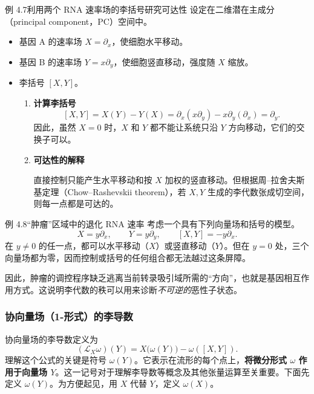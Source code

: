 \begin{statement}{例 4.7}{利用两个 RNA 速率场的李括号研究可达性}
设定在二维潜在主成分（principal component，PC）空间中。
\begin{itemize}
  \item 基因 A 的速率场 $X=\partial_x$，使细胞水平移动。
  \item 基因 B 的速率场 $Y=x\partial_y$，使细胞竖直移动，强度随 $X$ 缩放。
  \item 李括号 $[X,Y]$。
  \begin{enumerate}[label=\arabic*.]
    \item \textbf{计算李括号}
    \[
      [X,Y]=X(Y)-Y(X)=\partial_x(x\partial_y)-x\partial_y(\partial_x)
          =\partial_y.
    \]
    因此，虽然 $X=0$ 时，$X$ 和 $Y$ 都不能让系统只沿 $Y$ 方向移动，它们的交换子可以。
    \item \textbf{可达性的解释}

    直接控制只能产生水平移动和按 $X$ 加权的竖直移动。但根据周–拉舍夫斯基定理（Chow–Rashevskii theorem），若 $X,Y$ 生成的李代数张成切空间，则每一点都是可达的。
  \end{enumerate}
\end{itemize}
\end{statement}

\begin{statement}{例 4.8}{“肿瘤”区域中的退化 RNA 速率}
考虑一个具有下列向量场和括号的模型。
\[
  X=y\partial_x,\qquad Y=y\partial_y,\qquad [X,Y]=-y\partial_x.
\]
在 $y\ne0$ 的任一点，都可以水平移动（$X$）或竖直移动（$Y$）。但在 $y=0$ 处，三个向量场都为零，因而控制或括号的任何组合都无法越过这条屏障。

因此，肿瘤的调控程序缺乏逃离当前转录吸引域所需的“方向”，也就是基因相互作用方式。这说明李代数的秩可以用来诊断\emph{不可逆的}恶性子状态。
\end{statement}

\subsubsection{协向量场（1-形式）的李导数}
协向量场的李导数定义为
\[
  (\mathcal L_X\omega)(Y)=X\bigl(\omega(Y)\bigr)-\omega([X,Y]).
\]
理解这个公式的关键是符号 $\omega(Y)$。它表示在流形的每个点上，\textbf{将微分形式 $\omega$ 作用于向量场 $Y$}。这一记号对于理解李导数等概念及其他张量运算至关重要。下面先定义 $\omega(Y)$。为方便起见，用 $X$ 代替 $Y$，定义 $\omega(X)$。

